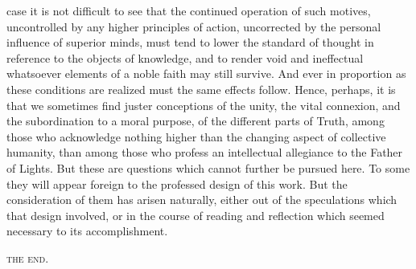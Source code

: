 \documentclass[oneside]{book}
\begin{document}
case it is not difficult to see that the continued operation of
such motives, uncontrolled by any higher principles of action,
uncorrected by the personal influence of superior minds, must
tend to lower the standard of thought in reference to the objects
of knowledge, and to render void and ineffectual whatsoever elements
of a noble faith may still survive. And ever in proportion
as these conditions are realized must the same effects follow.
Hence, perhaps, it is that we sometimes find juster conceptions
of the unity, the vital connexion, and the subordination to a
moral purpose, of the different parts of Truth, among those who
acknowledge nothing higher than the changing aspect of collective
humanity, than among those who profess an intellectual
allegiance to the Father of Lights. But these are questions
which cannot further be pursued here. To some they will appear
foreign to the professed design of this work. But the
consideration of them has arisen naturally, either out of the
speculations which that design involved, or in the course of
reading and reflection which seemed necessary to its accomplishment.

\centerline{\textsc{the end.}}
\newpage
\end{document}
